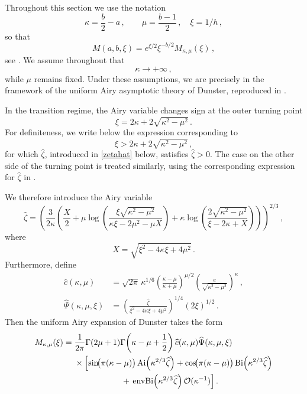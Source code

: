 \documentclass[11pt]{amsart}
\numberwithin{equation}{section}
\theoremstyle{remark}
\newcommand{\mn}{\medskip\noindent}
\begin{document}
Throughout this section we use the notation
\begin{equation}\label{eq:kappa-mu}
\kappa=\frac b2-a\,,
\qquad
\mu=\frac{b-1}{2}\,,\quad \xi=1/h\,,
\end{equation}
so that
\begin{equation}\label{Whittaker}
M(a,b,\xi)
=
e^{\xi/2}\xi^{-b/2}
M_{\kappa,\mu}(\xi)\,,
\end{equation}
see \cite[Eq.~13.14.4]{DLMF}. We assume throughout that
\[
\kappa\to+\infty\,,
\]
while \(\mu\) remains fixed. Under these assumptions, we are
precisely in the framework of the uniform Airy asymptotic theory of
Dunster, reproduced in \cite[\S13.21(iii)]{DLMF}.


\mn
In the transition regime, the Airy variable changes sign at the outer
turning point
\[
\xi=2\kappa+2\sqrt{\kappa^2-\mu^2}\,.
\]
For definiteness, we write below the expression corresponding to
\[
\xi>2\kappa+2\sqrt{\kappa^2-\mu^2}\,,
\]
for which $\widehat\zeta$, introduced in \eqref{zetahat} below, satisfies $\widehat\zeta>0$. The case on the other side of the turning
point is treated similarly, using the corresponding expression for
$\widehat\zeta$ in \cite[Eq.~(13.21.20)]{DLMF}.

We therefore introduce the Airy variable
\begin{equation}\label{zetahat}
\widehat{\zeta}
=
\left(
\frac{3}{2\kappa}
\left(
\frac{X}{2}
+
\mu
\log\!\left(
\frac{\xi\sqrt{\kappa^2-\mu^2}}
{\kappa\xi-2\mu^2-\mu X}
\right)
+
\kappa
\log\!\left(
\frac{2\sqrt{\kappa^2-\mu^2}}
{\xi-2\kappa+X}
\right)
\right)
\right)^{2/3}\,,
\end{equation}
where
\[
X=\sqrt{\xi^2-4\kappa\xi+4\mu^2}\,.
\]
Furthermore, define
%
\begin{align*}
\widehat c(\kappa,\mu)
&=
\sqrt{2\pi}\,
\kappa^{1/6}
\left(
\frac{\kappa-\mu}{\kappa+\mu}
\right)^{\mu/2}
\left(
\frac{e}{\sqrt{\kappa^2-\mu^2}}
\right)^\kappa\,,
\\
\widehat\Psi(\kappa,\mu,\xi)
&=
\left(
\frac{\widehat\zeta}
{\xi^2-4\kappa\xi+4\mu^2}
\right)^{1/4}
(2\xi)^{1/2}\,.
\end{align*}
%
Then the uniform Airy expansion of Dunster takes the form
\cite[Eq.~13.21.22]{DLMF}
\begin{equation}\label{AiryM}
\begin{aligned}
M_{\kappa,\mu}(\xi)
={}&
\frac{1}{2\pi}
\Gamma(2\mu+1)
\Gamma\!\left(\kappa-\mu+\frac12\right)
\widehat c(\kappa,\mu)
\widehat\Psi(\kappa,\mu,\xi)
\\
&\times
\Bigl[
\sin\!\bigl(\pi(\kappa-\mu)\bigr)
\operatorname{Ai}\!\left(\kappa^{2/3}\widehat\zeta\right)
+
\cos\!\bigl(\pi(\kappa-\mu)\bigr)
\operatorname{Bi}\!\left(\kappa^{2/3}\widehat\zeta\right)
\\
&\hspace{2cm}
+\,
\operatorname{envBi}
\!\left(\kappa^{2/3}\widehat\zeta\right)
\mathcal O(\kappa^{-1})
\Bigr]\,.
\end{aligned}
\end{equation}
\end{document}

